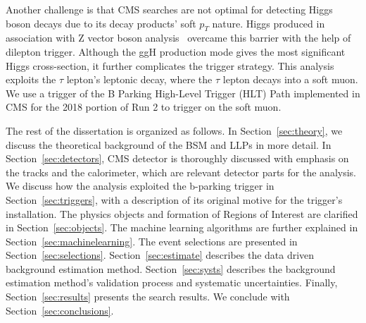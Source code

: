 Another challenge is that CMS searches are not optimal for detecting Higgs boson decays due to its decay products' soft $p_T$ nature.
Higgs produced in association with Z vector boson analysis~\cite{ZHAN} overcame this barrier with the help of dilepton trigger.
Although the ggH production mode gives the most significant Higgs cross-section, it further complicates the trigger strategy.
This analysis exploits the $\tau$ lepton's leptonic decay, where the $\tau$ lepton decays into a soft muon.
We use a trigger of the B Parking High-Level Trigger (HLT) Path implemented in CMS for the 2018 portion of Run 2 to trigger on the soft muon.



The rest of the dissertation is organized as follows.
In Section~\ref{sec:theory}, we discuss the theoretical background of the BSM and LLPs in more detail.
In Section~\ref{sec:detectors}, CMS detector is thoroughly discussed with emphasis on the tracks and the calorimeter, which are relevant detector parts for the analysis.
We discuss how the analysis exploited the b-parking trigger in Section~\ref{sec:triggers}, with a description of its original motive for the trigger's installation.
The physics objects and formation of Regions of Interest are clarified in Section~\ref{sec:objects}.
The machine learning algorithms are further explained in Section~\ref{sec:machinelearning}.
The event selections are presented in Section~\ref{sec:selections}.
Section~\ref{sec:estimate} describes the data driven background estimation method.
Section~\ref{sec:systs} describes the background estimation method's validation process and systematic uncertainties.
Finally, Section~\ref{sec:results} presents the search results.
We conclude with Section~\ref{sec:conclusions}.




